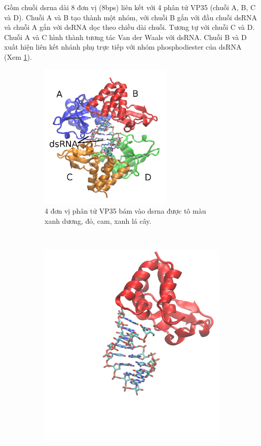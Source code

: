 \documentclass[12pt,a4paper,reqno, oneside]{book}
\begin{document}
		Gồm chuỗi \gls{dsrna} dài 8 đơn vị (8bps) liên kết với 4 phân tử VP35 (chuỗi A, B, C và D). Chuỗi A và B tạo thành một nhóm, với chuỗi B gắn với đầu chuỗi dsRNA và chuỗi A gắn với dsRNA dọc theo chiều dài chuỗi. Tương tự với chuỗi C và D. Chuỗi A và C hình thành tương tác Van der Waals với dsRNA. Chuỗi B và D xuất hiện liên kết nhánh phụ trực tiếp với nhóm phosphodiester của dsRNA\cite{Leung2010} (Xem \ref{fig:vp35}).
		\begin{figure}[t!]
		\centering
		\begin{subfigure}{0.5\textheight}
		\centering
		\includegraphics[width=0.7\textwidth,natwidth=610,natheight=642]{VP35.png}
		\caption{4 đơn vị phân tử VP35 bám vào \gls{dsrna} được tô màu xanh dương, đỏ, cam, xanh lá cây.}
		\label{fig:vp35}
		\end{subfigure}\\
		\begin{subfigure}{0.5\textheight}
		\includegraphics[width=0.9\linewidth,natwidth=610,natheight=642]{VP35_B.png}

\end{subfigure}
\end{figure}
\end{document}

